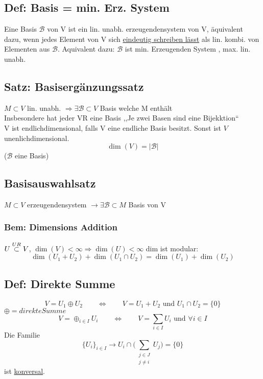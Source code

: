 \documentclass[titlepage,12pt,a4paper,ngerman]{report}
\begin{document}
\subsection{Def: Basis = min. Erz. System} Eine Basis $\mathcal{B}$ von V ist ein lin. unabh. erzeugendensystem von V, äquivalent dazu, wenn jedes Element von V sich \underline{eindeutig schreiben lässt} als lin. kombi. von Elementen aus $\mathcal{B}$. Aquivalent dazu: $\mathcal{B}$ ist min. Erzeugenden System , max. lin. unabh.\\
\subsection{Satz: Basisergänzungssatz}
$M\subset V$ lin. unabh. $\Rightarrow\exists \mathcal{B} \subset V $ Basis welche M enthält\\
Insbesondere hat jeder VR eine Basis ,,Je zwei Basen sind eine Bijekktion``\\
V ist endlichdimensional, falls V eine endliche Basis besitzt. Sonst ist $V$ unenlichdimensional.\\
$$\dim(V) = | \mathcal{B} | $$ ($\mathcal{B}$ eine Basis)\\

\subsection{Basisauswahlsatz}
$M\subset V$ erzeugendensystem $\rightarrow \exists \mathcal{B} \subset M $ Basis von V
\subsubsection{Bem: Dimensions Addition} 
$U\buildrel UR \over \subset V$, 
$\dim(V) < \infty \Rightarrow \dim(U) < \infty$
dim ist modular:
$$\dim(U_1 + U_2) + \dim(U_1 \cap U_2) = \dim(U_1) + \dim(U_2)$$

\subsection{Def: Direkte Summe}
$$V=U_1 \oplus U_2 \qquad \Leftrightarrow \qquad V= U_1 + U_2\textrm{ und }  U_1 \cap U_2 = \{0\}$$
$\oplus = direkte Summe$\\
$$ V = \oplus_{i \in I} U_{i} \qquad \Leftrightarrow \qquad V = \sum_{i\in I } U_i \textrm{ und } \forall i \in I $$
Die Familie $$\{U_i\}_{i \in I} \rightarrow U_i \cap \Big(\sum_{\substack{j\in J\\ j\neq i}} U_j \Big)=\{0\}$$
ist \underline{konversal}.
\end{document}
